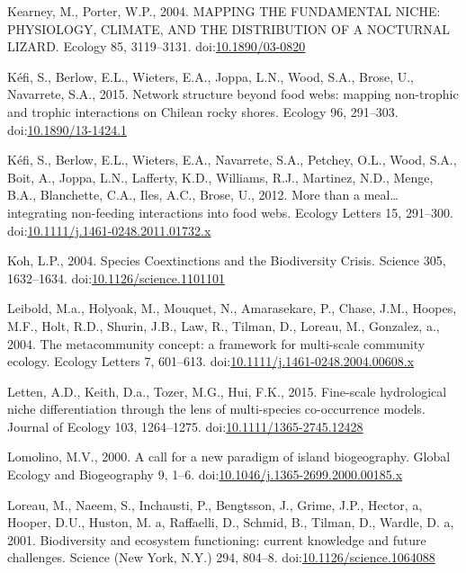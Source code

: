 \hypertarget{ref-Kearney2004}{}
Kearney, M., Porter, W.P., 2004. MAPPING THE FUNDAMENTAL NICHE:
PHYSIOLOGY, CLIMATE, AND THE DISTRIBUTION OF A NOCTURNAL LIZARD. Ecology
85, 3119--3131.
doi:\href{https://doi.org/10.1890/03-0820}{10.1890/03-0820}

\hypertarget{ref-Kefi2015}{}
Kéfi, S., Berlow, E.L., Wieters, E.A., Joppa, L.N., Wood, S.A., Brose,
U., Navarrete, S.A., 2015. Network structure beyond food webs: mapping
non-trophic and trophic interactions on Chilean rocky shores. Ecology
96, 291--303.
doi:\href{https://doi.org/10.1890/13-1424.1}{10.1890/13-1424.1}

\hypertarget{ref-Kefi2012}{}
Kéfi, S., Berlow, E.L., Wieters, E.A., Navarrete, S.A., Petchey, O.L.,
Wood, S.A., Boit, A., Joppa, L.N., Lafferty, K.D., Williams, R.J.,
Martinez, N.D., Menge, B.A., Blanchette, C.A., Iles, A.C., Brose, U.,
2012. More than a meal\ldots{} integrating non-feeding interactions into
food webs. Ecology Letters 15, 291--300.
doi:\href{https://doi.org/10.1111/j.1461-0248.2011.01732.x}{10.1111/j.1461-0248.2011.01732.x}

\hypertarget{ref-Koh2004}{}
Koh, L.P., 2004. Species Coextinctions and the Biodiversity Crisis.
Science 305, 1632--1634.
doi:\href{https://doi.org/10.1126/science.1101101}{10.1126/science.1101101}

\hypertarget{ref-Leibold2004}{}
Leibold, M.a., Holyoak, M., Mouquet, N., Amarasekare, P., Chase, J.M.,
Hoopes, M.F., Holt, R.D., Shurin, J.B., Law, R., Tilman, D., Loreau, M.,
Gonzalez, a., 2004. The metacommunity concept: a framework for
multi-scale community ecology. Ecology Letters 7, 601--613.
doi:\href{https://doi.org/10.1111/j.1461-0248.2004.00608.x}{10.1111/j.1461-0248.2004.00608.x}

\hypertarget{ref-Letten2015}{}
Letten, A.D., Keith, D.a., Tozer, M.G., Hui, F.K., 2015. Fine-scale
hydrological niche differentiation through the lens of multi-species
co-occurrence models. Journal of Ecology 103, 1264--1275.
doi:\href{https://doi.org/10.1111/1365-2745.12428}{10.1111/1365-2745.12428}

\hypertarget{ref-Lomolino2000}{}
Lomolino, M.V., 2000. A call for a new paradigm of island biogeography.
Global Ecology and Biogeography 9, 1--6.
doi:\href{https://doi.org/10.1046/j.1365-2699.2000.00185.x}{10.1046/j.1365-2699.2000.00185.x}

\hypertarget{ref-Loreau2001}{}
Loreau, M., Naeem, S., Inchausti, P., Bengtsson, J., Grime, J.P.,
Hector, a, Hooper, D.U., Huston, M. a, Raffaelli, D., Schmid, B.,
Tilman, D., Wardle, D. a, 2001. Biodiversity and ecosystem functioning:
current knowledge and future challenges. Science (New York, N.Y.) 294,
804--8.
doi:\href{https://doi.org/10.1126/science.1064088}{10.1126/science.1064088}

